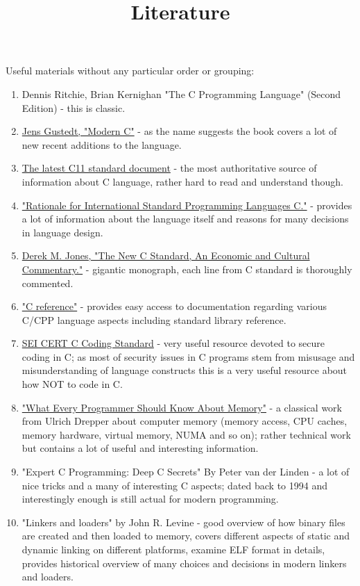 \documentclass{article}
\begin{document}
\title{Literature}
{\Large Useful materials without any particular order or grouping:}
\begin{enumerate}
\item Dennis Ritchie, Brian Kernighan "The C Programming Language" (Second Edition) - this is classic.
\item \href{http://icube-icps.unistra.fr/img_auth.php/d/db/ModernC.pdf}{Jens Gustedt, "Modern C"} - as the name suggests the book covers a lot of new recent additions to the language.
\item \href{http://www.open-std.org/jtc1/sc22/wg14/www/docs/n1548.pdf}{The latest C11 standard document} - the most authoritative source of information about C language, rather hard to read and understand though.
\item \href{http://www.open-std.org/jtc1/sc22/wg14/www/C99RationaleV5.10.pdf}{"Rationale for International Standard Programming Languages C."} - provides a lot of information about the language itself and reasons for many decisions in language design.
\item \href{http://people.ece.cornell.edu/land/courses/ece4760/cbook1_1.pdf}{Derek M. Jones, "The New C Standard, An Economic and Cultural Commentary."} - gigantic monograph, each line from C standard is thoroughly commented.
\item \href{http://en.cppreference.com/w/c}{"C reference"} - provides easy access to documentation regarding various C/CPP language aspects including standard library reference.
\item \href{https://www.securecoding.cert.org/confluence/display/c/SEI+CERT+C+Coding+Standard}{SEI CERT C Coding Standard} - very useful resource devoted to secure coding in C; as most of security issues in C programs stem from misusage and misunderstanding of language constructs this is a very useful resource about how NOT to code in C.
\item \href{https://www.akkadia.org/drepper/cpumemory.pdf}{"What Every Programmer Should Know About Memory"} - a classical work from Ulrich Drepper about computer memory (memory access, CPU caches, memory hardware, virtual memory, NUMA and so on); rather technical work but contains a lot of useful and interesting information.
\item "Expert C Programming: Deep C Secrets" By Peter van der Linden - a lot of nice tricks and a many of interesting C aspects; dated back to 1994 and interestingly enough is still actual for modern programming.
\item "Linkers and loaders" by John R. Levine - good overview of how binary files are created and then loaded to memory, covers different aspects of static and dynamic linking on different platforms, examine ELF format in details, provides historical overview of many choices and decisions in modern linkers and loaders.

\end{enumerate}
\end{document}
